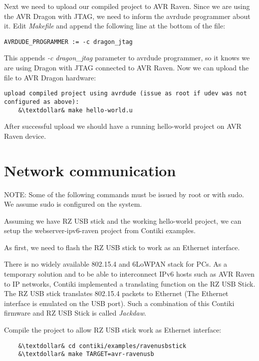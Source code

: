 \documentclass{article}
\begin{document}
Next we need to upload our compiled project to AVR Raven.
Since we are using the AVR Dragon with JTAG, we need to inform the avrdude programmer about it.
Edit {\it{Makefile}} and append the following line at the bottom of the file:
\begin{lstlisting}
AVRDUDE_PROGRAMMER := -c dragon_jtag
\end{lstlisting}

This appends {\it{-c dragon\_jtag}} parameter to avrdude programmer, so it knows we are using Dragon with JTAG connected to AVR Raven.
Now we can upload the file to AVR Dragon hardware:
\begin{lstlisting}
upload compiled project using avrdude (issue as root if udev was not configured as above):
	&\textdollar& make hello-world.u
\end{lstlisting}
After successful upload we should have a running hello-world project on AVR Raven device.


\section{Network communication}
NOTE: Some of the following commands must be issued by root or with sudo. We assume sudo is configured on the system.

Assuming we have RZ USB stick and the working hello-world project,
we can setup the webserver-ipv6-raven project from Contiki examples.

As first, we need to flash the RZ USB stick to work as an Ethernet interface.

There is no widely available 802.15.4 and 6LoWPAN stack for PCs.
As a temporary solution and to be able to interconnect IPv6 hosts such as AVR Raven to IP networks,
Contiki implemented a translating function on the RZ USB Stick.
The RZ USB stick translates 802.15.4 packets to Ethernet (The Ethernet interface is emulated on the USB port).
Such a combination of this Contiki firmware and RZ USB Stick is called {\it{Jackdaw}}.


Compile the project to allow RZ USB stick work as Ethernet interface:
\begin{lstlisting}
	&\textdollar& cd contiki/examples/ravenusbstick
	&\textdollar& make TARGET=avr-ravenusb
\end{lstlisting}
\end{document}
